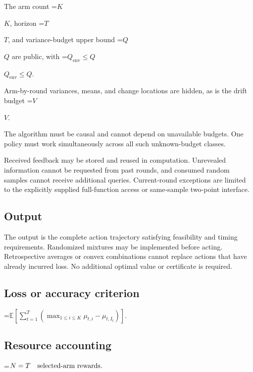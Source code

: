 \documentclass[10pt,a4paper]{article}
\newcommand{\AtlasMath}[1]{\par\begingroup\centering\setbox0=\hbox{$\displaystyle #1$}\ifdim\wd0>1.4\linewidth\typeout{ATLAS WIDE FORMULA: \the\wd0}\fi\ifdim\wd0>\linewidth\resizebox{\linewidth}{!}{\box0}\else\box0\fi\par\endgroup}
\newcommand{\AtlasInlineMath}[1]{\begingroup\setbox0=\hbox{$#1$}\ifdim\wd0>.4\linewidth\endgroup\AtlasMath{#1}\else\endgroup$#1$\fi}
\begin{document}
The arm count \AtlasInlineMath{K}, horizon \AtlasInlineMath{T}, and variance-budget upper bound \AtlasInlineMath{Q} are public, with \AtlasInlineMath{Q_{\mathrm{env}}\le Q}.



Arm-by-round variances, means, and change locations are hidden, as is the drift budget \AtlasInlineMath{V}.



The algorithm must be causal and cannot depend on unavailable budgets. One policy must work simultaneously across all such unknown-budget classes.



Received feedback may be stored and reused in computation. Unrevealed information cannot be requested from past rounds, and consumed random samples cannot receive additional queries. Current-round exceptions are limited to the explicitly supplied full-function access or same-sample two-point interface.



\subsection{Output}


The output is the complete action trajectory satisfying feasibility and timing requirements. Randomized mixtures may be implemented before acting. Retrospective averages or convex combinations cannot replace actions that have already incurred loss. No additional optimal value or certificate is required.



\subsection{Loss or accuracy criterion}



\AtlasMath{\mathbb{E}\!\left[\sum_{t=1}^{T}\left(\max_{1\le i\le K}\mu_{t,i}-\mu_{t,I_t}\right)\right].}




\subsection{Resource accounting}



\AtlasMath{N=T\quad\text{\text{selected-arm rewards}}.}
\end{document}
